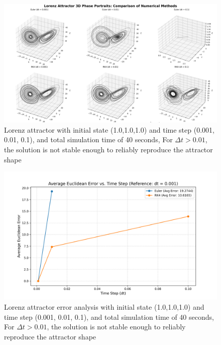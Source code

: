 \begin{figure}[!ht]
  \centering
  \includegraphics[width=1.0\linewidth]{images/phase_portraits1.1.4.png} 
  \caption{Lorenz attractor with initial state (1.0,1.0,1.0) and time step (0.001, 0.01, 0.1), and total simulation time of 40 seconds,  For $\Delta t > 0.01$, the solution is not stable enough to reliably reproduce the attractor shape\cite{youngaryanLorenzPlot1.1.4_image}}
  \label{fig:lorenz_vis}
\end{figure}


\begin{figure}[!ht]
  \centering
  \includegraphics[width=1.0\linewidth]{images/error_comparison1.1.4.png} 
  \caption{Lorenz attractor error analysis with initial state (1.0,1.0,1.0) and time step (0.001, 0.01, 0.1), and total simulation time of 40 seconds,  For $\Delta t > 0.01$, the solution is not stable enough to reliably reproduce the attractor shape\cite{youngaryanLorenzPlot1.1.4_image}}
  \label{fig:error_comparison1.1.4}
\end{figure}

